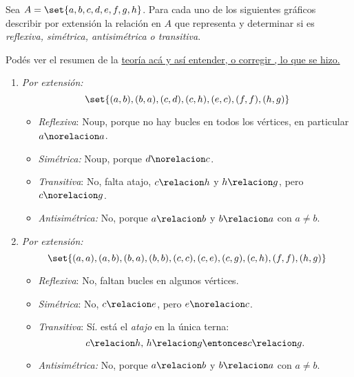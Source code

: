 \begin{enunciado}{\ejercicio}
  Sea $A = \set{a,b,c,d,e,f,g,h}$. Para cada uno de los siguientes gráficos describir por
  extensión la relación en $A$ que representa y determinar si es \textit{reflexiva, simétrica, antisimétrica o transitiva}.
\end{enunciado}
Podés ver el resumen de la \hyperlink{teoria-1:relaciones}{teoría acá y así entender, o corregir , lo que se hizo.}

\begin{enumerate}[label=\roman*)]

  \item
        \begin{minipage}{0.3\textwidth}
          \diecinuevei
        \end{minipage}
        \begin{minipage}{0.7\textwidth}
          \textit{Por extensión:}
          $$
            \set{(a,b),(b,a),(c,d),(c,h),(e,c),(f,f),(h,g)}
          $$
          \begin{itemize}
            \item \textit{Reflexiva}: Noup, porque no hay bucles en todos los vértices, en particular $a \norelacion a$.
            \item \textit{Simétrica:} Noup, porque $d \norelacion c$.
            \item \textit{Transitiva}: No, falta atajo, $c \relacion h$ y $h \relacion g$, pero $c \norelacion g$.
            \item \textit{Antisimétrica:} No, porque $a \relacion b$ y $b \relacion a$ con $a \neq b$.
          \end{itemize}
        \end{minipage}

        \bigskip

  \item
        \begin{minipage}{0.25\textwidth}
          \diecinueveii
        \end{minipage}
        \begin{minipage}{0.7\textwidth}
          \textit{Por extensión:}
          $$
            \set{(a,a),(a,b),(b,a),(b,b),(c,c),(c,e),(c,g),
              (c,h),(f,f),(h,g)}
          $$
          \begin{itemize}
            \item \textit{Reflexiva}: No, faltan bucles en algunos vértices.
            \item \textit{Simétrica}: No, $c \relacion e$, pero $e \norelacion c$.
            \item \textit{Transitiva}: Sí. está el \textit{atajo} en la única terna:
                  $$
                    c \relacion h,\, h \relacion g \entonces c \relacion g.
                  $$
            \item \textit{Antisimétrica:} No, porque $a \relacion b$ y $b \relacion a$ con $a \neq b$.
          \end{itemize}
        \end{minipage}


\end{enumerate}
